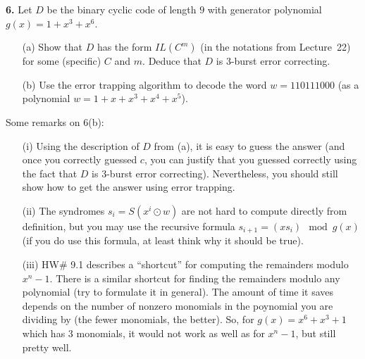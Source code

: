 \documentclass[12pt]{amsart}
\begin{document}
\skv
{\bf 6.} Let $D$ be the binary cyclic code of length $9$ with generator polynomial $g(x)=1+x^3+x^6$. 
\begin{itemize}
\item[(a)] Show that $D$ has the form $IL(C^m)$ (in the notations from Lecture~22) for some (specific) $C$ and $m$. Deduce
that $D$ is $3$-burst error correcting.
\item[(b)] Use the error trapping algorithm to decode the word $w=110111000$ (as a polynomial $w=1+x+x^3+x^4+x^5$). 
\end{itemize}
Some remarks on 6(b):
\begin{itemize}
\item[(i)] Using the description of $D$ from (a), it is easy to guess the answer (and once you correctly guessed $c$, you can justify that you guessed correctly using the fact that $D$ is $3$-burst error correcting). Nevertheless, you should still show how to get the answer using error trapping.
\item[(ii)] The syndromes $s_i=S(x^i\odot w)$ are not hard to compute directly from definition, but you may use the recursive formula $s_{i+1}=(x s_i)\mod g(x)$ (if you do use this formula, at least think why it should be true).
\item[(iii)] HW\# 9.1 describes a ``shortcut'' for computing the remainders modulo $x^n-1$. There is a similar shortcut for finding the remainders modulo any polynomial (try to formulate it in general). The amount of time it saves depends on the number of nonzero monomials in the poynomial you are dividing by (the fewer monomials, the better). So, for $g(x)=x^6+x^3+1$ which has 3 monomials, it would not work as well as for $x^n-1$, but still pretty well.
\end{itemize}
\end{document}
